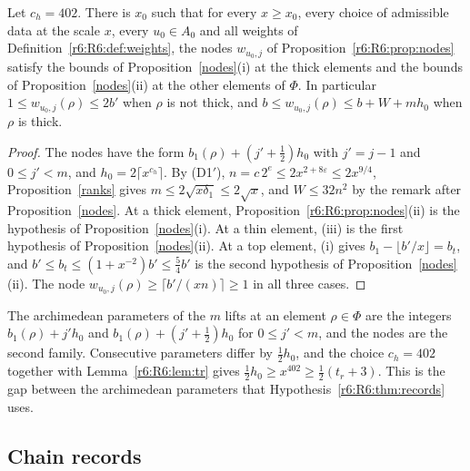 \begin{corollary}\label{r6:R6:cor:nodes}
Let $c_h=402$. There is $x_0$ such that for every $x\ge x_0$, every choice of admissible data at the scale $x$, every $u_0\in A_0$ and all weights of Definition~\ref{r6:R6:def:weights}, the nodes $w_{u_0,j}$ of Proposition~\ref{r6:R6:prop:nodes} satisfy the bounds of Proposition~\ref{nodes}(i) at the thick elements and the bounds of Proposition~\ref{nodes}(ii) at the other elements of $\Phi$. In particular $1\le w_{u_0,j}(\rho)\le2b'$ when $\rho$ is not thick, and $b\le w_{u_0,j}(\rho)\le b+W+mh_0$ when $\rho$ is thick.
\end{corollary}

\begin{proof}
The nodes have the form $b_1(\rho)+(j'+\frac12)h_0$ with $j'=j-1$ and $0\le j'<m$, and $h_0=2\lceil x^{c_h}\rceil$. By (D1$'$), $n=c\,2^e\le2x^{2+8\varepsilon}\le2x^{9/4}$, Proposition~\ref{ranks} gives $m\le2\sqrt{x\delta_1}\le2\sqrt x$, and $W\le32n^2$ by the remark after Proposition~\ref{nodes}. At a thick element, Proposition~\ref{r6:R6:prop:nodes}(ii) is the hypothesis of Proposition~\ref{nodes}(i). At a thin element, (iii) is the first hypothesis of Proposition~\ref{nodes}(ii). At a top element, (i) gives $b_1-\lfloor b'/x\rfloor=b_t$, and $b'\le b_t\le(1+x^{-2})b'\le\frac54b'$ is the second hypothesis of Proposition~\ref{nodes}(ii). The node $w_{u_0,j}(\rho)\ge\lceil b'/(xn)\rceil\ge1$ in all three cases.
\end{proof}

The archimedean parameters of the $m$ lifts at an element $\rho\in\Phi$ are the integers $b_1(\rho)+j'h_0$ and $b_1(\rho)+(j'+\frac12)h_0$ for $0\le j'<m$, and the nodes are the second family. Consecutive parameters differ by $\frac12h_0$, and the choice $c_h=402$ together with Lemma~\ref{r6:R6:lem:tr} gives $\frac12h_0\ge x^{402}\ge\frac12(t_r+3)$. This is the gap between the archimedean parameters that Hypothesis~\ref{r6:R6:thm:records} uses.

\subsection{Chain records}\label{r6:R6:sec:records}

